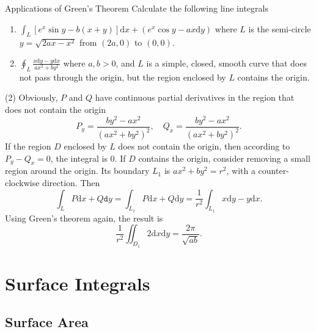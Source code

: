 \begin{example}{Applications of Green's Theorem}{}
  Calculate the following line integrals
  \begin{enumerate}
  \item $\int_L [e^x \sin y - b(x+y)]\mathrm{d} x + (e^x\cos y - ax\mathrm{d}
    y)$ where $L$ is the semi-circle $y = \sqrt{2ax - x^2}$ from $(2a, 0)$ to
    $(0, 0)$.
  \item $\oint_L \frac{x \mathrm{d} y - y \mathrm{d} x}{ax^2 + by^2}$ where
    $a, b> 0$, and
    $L$ is a simple, closed, smooth curve that does not pass through the origin,
    but the region enclosed by $L$ contains the origin.
  \end{enumerate}
\end{example}

\begin{solution}
  (2) Obviously, $P$ and $Q$ have continuous partial derivatives in the region
  that does not contain the origin
  \begin{equation}
    P_y = \frac{by^2 - ax^2}{(ax^2 + by^2)^2}, \quad
    Q_x = \frac{by^2 - ax^2}{(ax^2 + by^2)^2}.
  \end{equation}
  If the region $D$ enclosed by $L$ does not contain the origin,
  then according to $P_y - Q_x = 0$, the integral is $0$.
  If $D$ contains the origin, consider removing a small region around the
  origin.
  Its boundary $L_1$ is $ax^2 + by^2 = r^2$, with a counter-clockwise direction.
  Then
  \begin{equation}
    \int_L P \mathrm{d} x + Q \mathtt{d}y
    = \int_{L_1} P\mathrm{d} x + Q\mathrm{d} y
    = \frac{1}{r^2} \int_{L_1} x\mathrm{d} y - y\mathrm{d} x.
  \end{equation}
  Using Green's theorem again, the result is
  \begin{equation}
    \frac{1}{r^2} \iint_{D_1}2\mathrm{d} x \mathrm{d} y = \frac{2\pi}{\sqrt{ab}}.
  \end{equation}
\end{solution}

\section{Surface Integrals}

\subsection{Surface Area}

